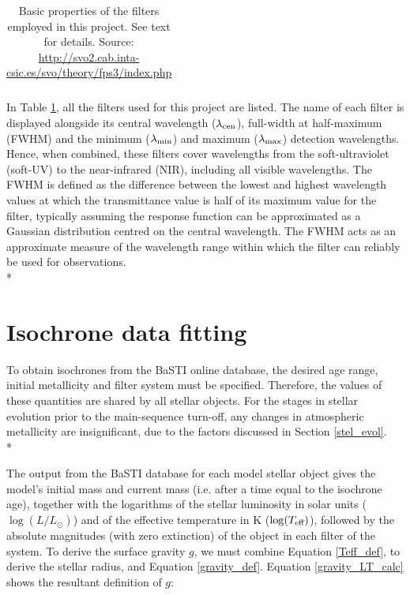 \documentclass[12pt, a4paper]{report}
\begin{document}
\begin{table}
\begin{center}
\begin{tabular}{cccccc}
\end{tabular}
\caption{Basic properties of the filters employed in this project. See text for details. Source: \protect\url{http://svo2.cab.inta-csic.es/svo/theory/fps3/index.php}}
\label{filter_basics}
\end{center}
\end{table}

In Table \ref{filter_basics}, all the filters used for this project are listed. The name of each filter is displayed alongside its central wavelength ($\lambda_{\textnormal{cen}}$), full-width at half-maximum (FWHM) and the minimum ($\lambda_{\textnormal{min}}$) and maximum ($\lambda_{\textnormal{max}}$) detection wavelengths. Hence, when combined, these filters cover wavelengths from the soft-ultraviolet (soft-UV) to the near-infrared (NIR), including all visible wavelengths. The FWHM is defined as the difference between the lowest and highest wavelength values at which the transmittance value is half of its maximum value for the filter, typically assuming the response function can be approximated as a Gaussian distribution centred on the central wavelength. The FWHM acts as an approximate measure of the wavelength range within which the filter can reliably be used for observations.\\*

\section{Isochrone data fitting}
To obtain isochrones from the BaSTI online database, the desired age range, initial metallicity and filter system must be specified. Therefore, the values of these quantities are shared by all stellar objects. For the stages in stellar evolution prior to the main-sequence turn-off, any changes in atmospheric metallicity are insignificant, due to the factors discussed in Section \ref{stel_evol}.\\*

The output from the BaSTI database for each model stellar object gives the model's initial mass and current mass (i.e. after a time equal to the isochrone age), together with the logarithms of the stellar luminosity in solar units ($\log(L/L_{\odot})$) and of the effective temperature in K ($\log(T_{\textnormal{eff}})$), followed by the absolute magnitudes (with zero extinction) of the object in each filter of the system. To derive the surface gravity $g$, we must combine Equation \ref{Teff_def}, to derive the stellar radius, and Equation \ref{gravity_def}. Equation \ref{gravity_LT_calc} shows the resultant definition of $g$:
\end{document}
